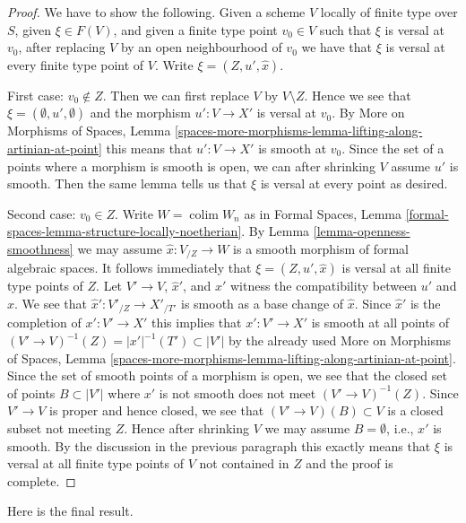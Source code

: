 \documentclass{stacks-project}
\theoremstyle{plain}
\theoremstyle{definition}
\theoremstyle{remark}
\numberwithin{equation}{subsection}
\def\colim{\mathop{\mathrm{colim}}\nolimits}
\begin{document}
\begin{proof}
We have to show the following. Given a scheme $V$ locally of finite type over
$S$, given $\xi \in F(V)$, and given a finite type point $v_0 \in V$ such that
$\xi$ is versal at $v_0$, after replacing $V$ by an open neighbourhood
of $v_0$ we have that $\xi$ is versal at every finite type point of $V$.
Write $\xi = (Z, u', \hat x)$.

\medskip\noindent
First case: $v_0 \not \in Z$. Then we can first replace $V$ by
$V \setminus Z$. Hence we see that $\xi = (\emptyset, u', \emptyset)$
and the morphism $u' : V \to X'$ is versal at $v_0$.
By More on Morphisms of Spaces, Lemma
\ref{spaces-more-morphisms-lemma-lifting-along-artinian-at-point}
this means that $u' : V \to X'$ is smooth at $v_0$.
Since the set of a points where a morphism is smooth is open,
we can after shrinking $V$ assume $u'$ is smooth.
Then the same lemma tells us that $\xi$ is versal at every
point as desired.

\medskip\noindent
Second case: $v_0 \in Z$. Write $W = \colim W_n$ as in
Formal Spaces, Lemma \ref{formal-spaces-lemma-structure-locally-noetherian}.
By Lemma \ref{lemma-openness-smoothness} we may assume $\hat x : V_{/Z} \to W$
is a smooth morphism of formal algebraic spaces. It follows immediately
that $\xi = (Z, u', \hat x)$ is versal at all finite type points of $Z$.
Let $V' \to V$, $\hat x'$, and $x'$ witness the compatibility between $u'$
and $\hat x$. We see that $\hat x' : V'_{/Z} \to X'_{/T'}$ is smooth as a
base change of $\hat x$. Since $\hat x'$ is the completion of
$x' : V' \to X'$ this implies that $x' : V' \to X'$ is smooth at all
points of $(V' \to V)^{-1}(Z) = |x'|^{-1}(T') \subset |V'|$
by the already used More on Morphisms of Spaces, Lemma
\ref{spaces-more-morphisms-lemma-lifting-along-artinian-at-point}.
Since the set of smooth points of a morphism is open, we see that
the closed set of points $B \subset |V'|$ where $x'$ is not smooth
does not meet $(V' \to V)^{-1}(Z)$. Since $V' \to V$ is proper and
hence closed, we see that $(V' \to V)(B) \subset V$ is a closed
subset not meeting $Z$. Hence after shrinking $V$ we may assume
$B = \emptyset$, i.e., $x'$ is smooth. By the discussion in the previous
paragraph this exactly means that $\xi$ is versal at all finite type
points of $V$ not contained in $Z$ and the proof is complete.
\end{proof}

\noindent
Here is the final result.
\end{document}
